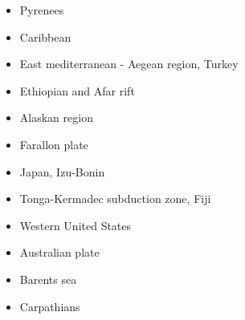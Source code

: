 \begin{itemize}
\item {Pyrenees} 
{\scriptsize
\cite{chou92}
\cite{qubh93}
\cite{giju98}
\cite{bemh00}
\cite{mcmg04}\cite{siss04}
\cite{jaml10}
\cite{vime12}
\cite{fihv13b}
\cite{jahm14}
\cite{dual19}\cite{jolm19}
}
\item{Caribbean} 
{\scriptsize
\cite{vago10}
\cite{vags13}
\cite{bovt14}\cite{vagw14}\cite{necb14}
\cite{homi15}\cite{necb15}
}
\item{East mediterranean - Aegean region, Turkey} 
{\scriptsize
\cite{gabm99}
\cite{cazf10}
\cite{enlm11}
\cite{jofh13}
\cite{ozgw17}
\cite{rohb20}
}
\item{Ethiopian and Afar rift} 
{\scriptsize
\cite{mitk07}
\cite{cort08}
\cite{kekj09}
\cite{beve10}
\cite{phcs14}\cite{sacs14}
\cite{brcr17}
\cite{brcg17}
\cite{cocf19}
}
\item{Alaskan region} 
{\scriptsize
\cite{jabi10a}
\cite{jabi12}
\cite{jabr13}
\cite{haja17}
\cite{mimo18}
}
\item{Farallon plate} 
{\scriptsize
\cite{lisg08}
\cite{list11}
\cite{list12}
\cite{licu16}
}
\item{Japan, Izu-Bonin}  
{\scriptsize
\cite{lohd07}
\cite{musi13}
\cite{kigk14}\cite{leli14}\cite{mova14}\cite{hond14}
\cite{kilk15}
\cite{yagz17}
\cite{yamg19}
}
\item{Tonga-Kermadec subduction zone, Fiji} 
{\scriptsize
\cite{bigs03}\cite{bigu03}
\cite{zhpy06}
}
\item{Western United States}
{\scriptsize
\cite{besb06}
}
\item Australian plate 
{\scriptsize
\cite{himu03}\cite{wemv03}\cite{pymi03}
\cite{onmj05}
\cite{hazs10}\cite{dimg10}
\cite{mahg11}\cite{digm11}
\cite{gosk14}
\cite{scsp15}
}
\item Barents sea 
{\scriptsize
\cite{buto07b}
\cite{gahs13}
\cite{gahs14}
}
\item Carpathians 

\end{itemize}
